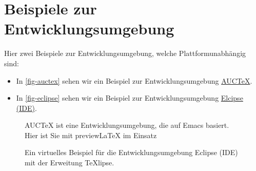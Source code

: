 \section{Beispiele zur Entwicklungsumgebung}
Hier zwei Beispiele zur Entwicklungsumgebung, welche Plattformunabhängig sind:
\begin{itemize}
\item 
In \vref{fig-auctex} sehen wir ein Beispiel zur Entwicklungsumgebung \href{https://de.wikipedia.org/wiki/AUCTeX}{AUCTeX}.
\item
In \vref{fig-eclipse} sehen wir ein Beispiel zur Entwicklungsumgebung \href{https://de.wikipedia.org/wiki/Eclipse_(IDE)}{Elcipse (IDE)}.
\end{itemize}
\clearpage
\begin{figure}
	\centering
	\caption[Beispiel zur Entwicklungsumgebung AucTeX.]{AUCTeX ist eine Entwicklungsumgebung, die auf Emacs basiert. Hier ist Sie mit previewLaTeX im Einsatz}
	\label{fig-auctex}
\end{figure}

\begin{figure}
	\centering
	\caption[Eclipse (IDE) mit der Erweiterung TeXlipse.]{Ein virtuelles Beispiel für die Entwicklungsumgebung Eclipse (IDE) mit der Erweitung TeXlipse.}
	\label{fig-eclipse}
\end{figure}